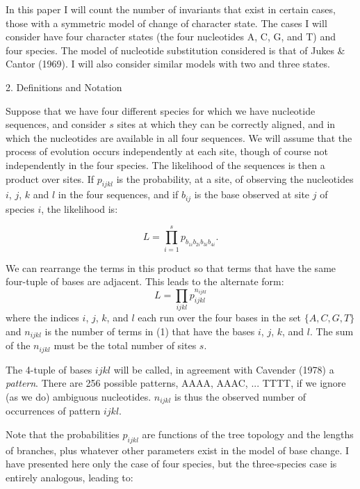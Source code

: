 In this paper I will count the number of invariants that 
exist in certain cases, those with a symmetric model of change of character 
state.  The cases I will consider have four character states (the four 
nucleotides A, C, G, and T) and four species.  The model of nucleotide 
substitution considered is that of Jukes \& Cantor (1969).  I will also 
consider similar models with two and three states.
\bigskip 

\centerline{2. Definitions and Notation}
\medskip 
     
Suppose that we have four different species for which we have nucleotide 
sequences, and consider $s$ sites at which they can be correctly aligned, and 
in which the nucleotides are available in all four sequences.  We will assume 
that the process of evolution occurs independently at each site, though of 
course not independently in the four species.  The likelihood of the sequences 
is then a product over sites. If $p_{ijkl}$ is the probability, at a site, of 
observing the nucleotides $i$, $j$, $k$ and $l$ in the four sequences, and if 
$b_{ij}$ is the base observed at site $j$ of species $i$, the likelihood is: 

\begin{equation} %
         L  =   \prod\limits_{i=1}^s p_{b_{1i}b_{2i}b_{3i}b_{4i}}. 
\end{equation}

We can rearrange the terms in this product so that terms that 
have the same four-tuple of bases are adjacent.  This leads to the alternate 
form:
\begin{equation} %
         L   =   \prod\limits_{ijkl} p_{ijkl}^{n_{ijkl}}
\end{equation}
where the indices $i$, $j$, $k$, and $l$ each run over the four bases in the
set $\{A, C, G, T\}$ and $n_{ijkl}$ is the number of terms in (1) that have the 
bases $i$, $j$, $k$, and $l$.  The sum of the $n_{ijkl}$ must be the total 
number of sites $s$. 

The 4-tuple of bases $ijkl$ will be called, in agreement with Cavender (1978) a 
{\it pattern}. There are 256 possible patterns, AAAA, AAAC, ... TTTT, if we 
ignore (as we do) ambiguous nucleotides.  $n_{ijkl}$ is thus the observed 
number of occurrences of pattern $ijkl$. 

Note that the probabilities $p_{ijkl}$ are functions of the tree topology and 
the lengths of branches, plus whatever other parameters exist in the model of 
base change.  I have presented here only the case of four species, but the 
three-species case is entirely analogous, leading to:

